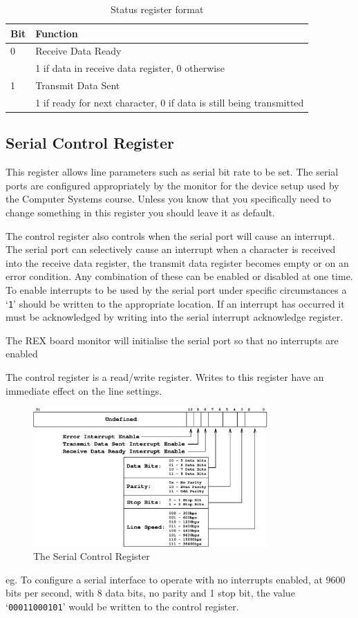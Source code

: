 \documentclass[a4paper,10pt]{article}
\begin{document}
\begin{table}[h]
\begin{center}
\begin{tabular}{|l|l|}
\hline
\textbf{Bit} & \textbf{Function} \\
\hline
0 & Receive Data Ready \\
 & 1 if data in receive data register, 0 otherwise \\
\hline
1 & Transmit Data Sent \\
 & 1 if ready for next character, 0 if data is still being transmitted  \\
\hline
\end{tabular}
\end{center}
\caption{Status register format}
\label{table:serialstat}
\end{table}

\subsection{Serial Control Register}

This register allows line parameters such as serial bit rate to be
set. The serial ports are configured appropriately by the monitor for
the device setup used by the Computer Systems course. Unless you know
that you specifically need to change something in this register you
should leave it as default.

The control register also controls when the serial port will cause an
interrupt. The serial port can selectively cause an interrupt when a
character is received into the receive data register, the transmit
data register becomes empty or on an error condition. Any combination of
these can be enabled or disabled at one time. To enable interrupts to
be used by the serial port under specific circumstances a `\texttt{1}'
should be written to the appropriate location. If an interrupt has
occurred it must be acknowledged by writing into the serial interrupt
acknowledge register.

The REX board monitor will initialise the serial port so that no
interrupts are enabled

The control register is a read/write register. Writes to this register
have an immediate effect on the line settings.

\begin{figure}[h]
\begin{center}
\includegraphics[width=0.8\textwidth]{serial_cr.eps}
\caption{The Serial Control Register}
\label{serial_cr_pic}
\end{center}
\end{figure}

\noindent
eg. To configure a serial interface to operate with no interrupts
enabled, at 9600 bits per second, with 8 data bits, no parity and 1
stop bit, the value `\texttt{00011000101}' would be written to the
control register.
\end{document}

